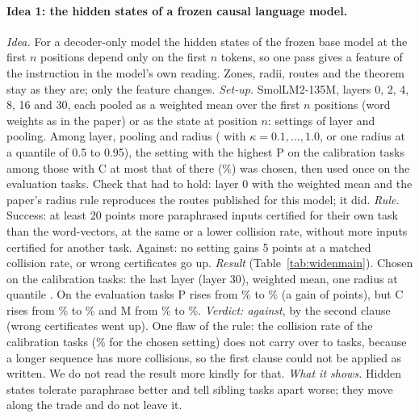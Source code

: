 \paragraph{Idea 1: the hidden states of a frozen causal language model.}
\emph{Idea.} For a decoder-only model the hidden states of the frozen base model at the first $n$
positions depend only on the first $n$ tokens, so one pass gives a feature of the instruction in the
model's own reading. Zones, radii, routes and the theorem stay as they are; only the feature changes.
\emph{Set-up.} SmolLM2-135M, layers 0, 2, 4, 8, 16 and 30, each pooled as a weighted mean over the
first $n$ positions (word weights as in the paper) or as the state at position $n$: \WidenFeatSettings{}
settings of layer and pooling. Among layer, pooling and radius (\cert{} with $\kappa = 0.1, \dots, 1.0$, or one radius at a quantile of 0.5 to 0.95), the setting with the
highest \textsf{P} on the calibration tasks among those with \textsf{C} at most that of \cert{} there (\WidenFeatCalRefC{}\%) was chosen, then used once on the evaluation tasks. Check that had to
hold: layer 0 with the weighted mean and the paper's radius rule reproduces the routes published for
this model; it did.
\emph{Rule.} Success: at least 20 points more paraphrased inputs certified for their own task than the
word-vectors, at the same or a lower collision rate, without more inputs certified for another task.
Against: no setting gains 5 points at a matched collision rate, or wrong certificates go up.
\emph{Result} (Table~\ref{tab:widenmain}). Chosen on the calibration tasks: the last layer
(layer 30), weighted mean, one radius at quantile \WidenFeatRadiusQuantile{}. On the
evaluation tasks \textsf{P} rises from \WidenRefSmolP{}\% to \WidenFeatP{}\% (a gain of \WidenFeatGain{}
points), but \textsf{C} rises from \WidenRefSmolC{}\% to \WidenFeatC{}\% and \textsf{M} from \WidenRefSmolM{}\% to
\WidenFeatM{}\%. \emph{Verdict: against}, by the second clause (wrong certificates went up). One
flaw of the rule: the collision rate of the calibration tasks (\WidenFeatCalC{}\% for the chosen
setting) does not carry over to \WidenTasksEval{} tasks, because a longer sequence has more collisions,
so the first clause could not be applied as written. We do not read the result more kindly for that.
\emph{What it shows.} Hidden states tolerate paraphrase better and tell sibling tasks apart worse;
they move along the trade and do not leave it.

